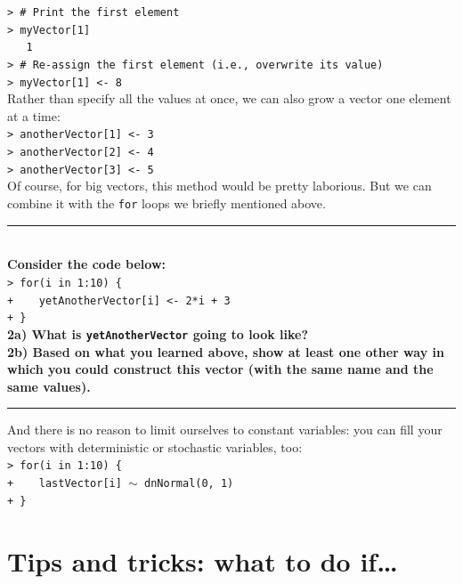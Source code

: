 \documentclass[12pt]{article}
\begin{document}
\indent \texttt{> \# Print the first element} \\
\indent \texttt{> myVector[1]} \\
\indent \texttt{\ \ \ 1} \\
\indent \texttt{> \# Re-assign the first element (i.e., overwrite its value)} \\
\indent \texttt{> myVector[1] <- 8} \\

\noindent Rather than specify all the values at once, we can also grow a vector one element at a time: \\

\indent \texttt{> anotherVector[1] <- 3} \\
\indent \texttt{> anotherVector[2] <- 4} \\
\indent \texttt{> anotherVector[3] <- 5} \\

\noindent Of course, for big vectors, this method would be pretty laborious. But we can combine it with the \texttt{for} loops we briefly mentioned above. \\

\hrule
\ \\[1ex]
\textbf{Consider the code below:} \\

\indent \texttt{> for(i in 1:10) \{} \\
\indent \texttt{+\ \ \ \ yetAnotherVector[i] <- 2*i + 3} \\
\indent \texttt{+ \} } \\

\noindent \textbf{2a) What is \texttt{yetAnotherVector} going to look like?} \\

\noindent \textbf{2b) Based on what you learned above, show at least one other way in which you could construct this vector (with the same name and the same values).} \\
\hrule

\noindent And there is no reason to limit ourselves to constant variables: you can fill your vectors with deterministic or stochastic variables, too: \\

\indent \texttt{> for(i in 1:10) \{} \\
\indent \texttt{+\ \ \ \ lastVector[i] {\footnotesize $\sim$} dnNormal(0, 1)} \\
\indent \texttt{+ \}}

\section*{Tips and tricks: what to do if\ldots}
\end{document}
